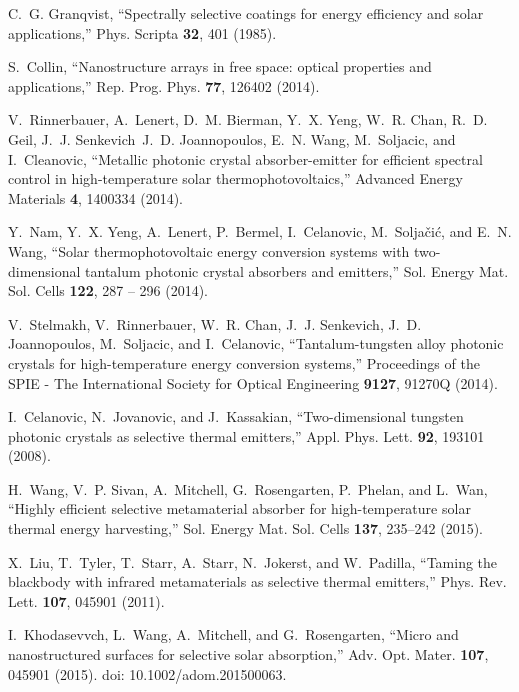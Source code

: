 \documentclass[10pt,letterpaper]{article}
\begin{document}
\begin{thebibliography}{100}
C.~G. Granqvist, \enquote{Spectrally selective coatings for energy efficiency
  and solar applications,} Phys. Scripta \textbf{32}, 401 (1985).

S.~Collin, \enquote{Nanostructure arrays in free space: optical properties and
  applications,} Rep. Prog. Phys. \textbf{77}, 126402 (2014).

V.~Rinnerbauer, A.~Lenert, D.~M. Bierman, Y.~X. Yeng, W.~R. Chan, R.~D. Geil,
  J.~J. Senkevich\, J.~D. Joannopoulos, E.~N. Wang, M.~Soljacic, and
  I.~Cleanovic, \enquote{{Metallic photonic crystal absorber-emitter for
  efficient spectral control in high-temperature solar thermophotovoltaics},}
  Advanced Energy Materials \textbf{4}, 1400334 (2014).

Y.~Nam, Y.~X. Yeng, A.~Lenert, P.~Bermel, I.~Celanovic, M.~Solja\v{c}i\'{c},
  and E.~N. Wang, \enquote{Solar thermophotovoltaic energy conversion systems
  with two-dimensional tantalum photonic crystal absorbers and emitters,} Sol.
  Energy Mat. Sol. Cells \textbf{122}, 287 -- 296 (2014).

V.~Stelmakh, V.~Rinnerbauer, W.~R. Chan, J.~J. Senkevich, J.~D. Joannopoulos,
  M.~Soljacic, and I.~Celanovic, \enquote{Tantalum-tungsten alloy photonic
  crystals for high-temperature energy conversion systems,} Proceedings of the
  SPIE - The International Society for Optical Engineering \textbf{9127},
  91270Q (2014).

I.~Celanovic, N.~Jovanovic, and J.~Kassakian, \enquote{Two-dimensional tungsten
  photonic crystals as selective thermal emitters,} Appl. Phys. Lett.
  \textbf{92}, 193101 (2008).

H.~Wang, V.~P. Sivan, A.~Mitchell, G.~Rosengarten, P.~Phelan, and L.~Wan,
  \enquote{Highly efficient selective metamaterial absorber for
  high-temperature solar thermal energy harvesting,} Sol. Energy Mat. Sol.
  Cells \textbf{137}, 235--242 (2015).

X.~Liu, T.~Tyler, T.~Starr, A.~Starr, N.~Jokerst, and W.~Padilla,
  \enquote{Taming the blackbody with infrared metamaterials as selective
  thermal emitters,} Phys. Rev. Lett. \textbf{107}, 045901 (2011).

I.~Khodasevvch, L.~Wang, A.~Mitchell, and G.~Rosengarten, \enquote{Micro and
  nanostructured surfaces for selective solar absorption,} Adv. Opt. Mater.
  \textbf{107}, 045901 (2015). {doi: 10.1002/adom.201500063}.


\end{thebibliography}
\end{document}

